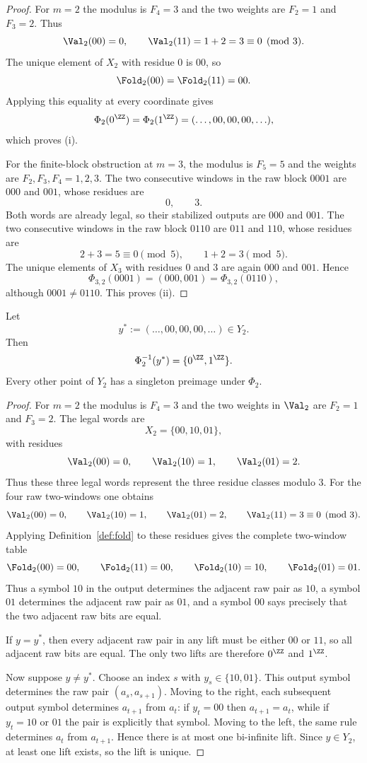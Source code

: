 \begin{proof}
For $m=2$ the modulus is $F_4=3$ and the two weights are
$F_2=1$ and $F_3=2$.  Thus
\[
\Val_2(00)=0,\qquad \Val_2(11)=1+2=3\equiv0\pmod 3.
\]
The unique element of $X_2$ with residue $0$ is $00$, so
\[
\Fold_2(00)=\Fold_2(11)=00.
\]
Applying this equality at every coordinate gives
\[
\Phi_2(0^{\ZZ})=\Phi_2(1^{\ZZ})=(\ldots,00,00,00,\ldots),
\]
which proves (i).

For the finite-block obstruction at $m=3$, the modulus is $F_5=5$ and the
weights are $F_2,F_3,F_4=1,2,3$.  The two consecutive windows in the raw block
$0001$ are $000$ and $001$, whose residues are
\[
0,\qquad 3.
\]
Both words are already legal, so their stabilized outputs are $000$ and
$001$.  The two consecutive windows in the raw block $0110$ are $011$ and
$110$, whose residues are
\[
2+3=5\equiv0\pmod5,\qquad 1+2=3\pmod5.
\]
The unique elements of $X_3$ with residues $0$ and $3$ are again $000$ and
$001$.  Hence
\[
\Phi_{3,2}(0001)=(000,001)=\Phi_{3,2}(0110),
\]
although $0001\ne0110$.  This proves (ii).
\end{proof}

\begin{theorem}\label{thm:m2-branch-locus}
Let
\[
y^\ast:=(\ldots,00,00,00,\ldots)\in Y_2.
\]
Then
\[
\Phi_2^{-1}(y^\ast)=\{0^{\ZZ},1^{\ZZ}\}.
\]
Every other point of $Y_2$ has a singleton preimage under $\Phi_2$.
\end{theorem}

\begin{proof}
For $m=2$ the modulus is $F_4=3$ and the two weights in $\Val_2$ are
$F_2=1$ and $F_3=2$.  The legal words are
\[
X_2=\{00,10,01\},
\]
with residues
\[
\Val_2(00)=0,\qquad \Val_2(10)=1,\qquad \Val_2(01)=2.
\]
Thus these three legal words represent the three residue classes modulo $3$.
For the four raw two-windows one obtains
\[
\Val_2(00)=0,\qquad
\Val_2(10)=1,\qquad
\Val_2(01)=2,\qquad
\Val_2(11)=3\equiv0\pmod3.
\]
Applying Definition~\ref{def:fold} to these residues gives the complete
two-window table
\[
\Fold_2(00)=00,\qquad \Fold_2(11)=00,\qquad
\Fold_2(10)=10,\qquad \Fold_2(01)=01.
\]
Thus a symbol $10$ in the output determines the adjacent raw pair as $10$, a
symbol $01$ determines the adjacent raw pair as $01$, and a symbol $00$ says
precisely that the two adjacent raw bits are equal.

If $y=y^\ast$, then every adjacent raw pair in any lift must be either $00$ or
$11$, so all adjacent raw bits are equal.  The only two lifts are therefore
$0^{\ZZ}$ and $1^{\ZZ}$.

Now suppose $y\ne y^\ast$.  Choose an index $s$ with
$y_s\in\{10,01\}$.  This output symbol determines the raw pair
$(a_s,a_{s+1})$.  Moving to the right, each subsequent output symbol determines
$a_{t+1}$ from $a_t$: if $y_t=00$ then $a_{t+1}=a_t$, while if
$y_t=10$ or $01$ the pair is explicitly that symbol.  Moving to the left,
the same rule determines $a_t$ from $a_{t+1}$.  Hence there is at most one
bi-infinite lift.  Since $y\in Y_2$, at least one lift exists, so the lift is
unique.
\end{proof}


